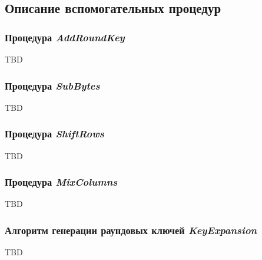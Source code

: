 \subsection{Описание вспомогательных процедур}

\subsubsection{Процедура \textit{AddRoundKey}} \label{AddRoundKey}

TBD

\subsubsection{Процедура \textit{SubBytes}} \label{SubBytes}

TBD

\subsubsection{Процедура \textit{ShiftRows}} \label{ShiftRows}

TBD

\subsubsection{Процедура \textit{MixColumns}} \label{MixColumns}

TBD

\subsubsection{Алгоритм генерации раундовых ключей \textit{KeyExpansion}} \label{KeyExpansion}

TBD
